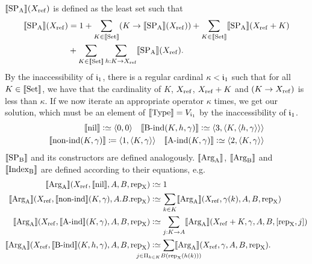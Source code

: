 \documentclass{article}
\begin{document}
$\llbracket \text{SP}_{\mathrm{A}} \rrbracket(X_{\mathrm{ref}})$ is defined as the least set such that
\begin{align*}
\llbracket \text{SP}_{\mathrm{A}} \rrbracket(X_{\mathrm{ref}}) &= 1 + \sum_{K \in \llbracket \text{Set} \rrbracket}(K \to \llbracket \text{SP}_{\mathrm{A}} \rrbracket(X_{\mathrm{ref}}))
  + \sum_{K \in \llbracket \text{Set} \rrbracket}\llbracket \text{SP}_{\mathrm{A}} \rrbracket(X_{\mathrm{ref}} + K) \\
 & {} + \sum_{K \in \llbracket \text{Set} \rrbracket}\sum_{h : K \to X_{\mathrm{ref}}}\llbracket \text{SP}_{\mathrm{A}} \rrbracket(X_{\mathrm{ref}}).
\end{align*}
 By the inaccessibility of $\mathfrak{i}_1$, there is a
regular cardinal ${\kappa < \mathfrak{i}_1}$ such that for all $K \in \llbracket \text{Set} \rrbracket$, we
have that the cardinality of $K$, $X_{\mathrm{ref}}$, $X_{\mathrm{ref}} + K$ and $(K \to X_{\mathrm{ref}})$ is less than
$\kappa$. If we now iterate an appropriate operator $\kappa$ times, we get our
solution, which must be an element of $\llbracket \text{Type} \rrbracket = V_{\mathfrak{i}_1}$ by the
inaccessibility of $\mathfrak{i}_1$.
\begin{align*}
 \llbracket \text{nil} \rrbracket \mathrel{\mathop:}\simeq \langle 0, 0\rangle \quad
 \llbracket \text{B-ind}(K, h, \gamma) \rrbracket \mathrel{\mathop:}\simeq \langle 3 , \langle K, \langle h, \gamma \rangle\rangle\rangle
   \\
  \llbracket \text{non-ind}(K, \gamma) \rrbracket \coloneqq \langle 1 , \langle K, \gamma
  \rangle\rangle \quad \llbracket \text{A-ind}(K, \gamma) \rrbracket \mathrel{\mathop:}\simeq \langle 2 , \langle K, \gamma \rangle\rangle
\end{align*}
$\llbracket \text{SP}_{\mathrm{B}} \rrbracket$ and its constructors are defined
analogously. $\llbracket \text{Arg}_{\mathrm{A}} \rrbracket$, $\llbracket \text{Arg}_{\mathrm{B}} \rrbracket$ and $\llbracket \text{Index}_{\mathrm{B}} \rrbracket$ are defined according to their equations,
e.g.\ 
\begin{align*}
  \sem{\ArgA}(\Xref, \sem{\nilA}, A, B, \repA) &\colonsimeq 1 \\
\sem{\ArgA}(\Xref, \sem{\nonindA}(K, \gamma), A. B. \repA) &\colonsimeq
  \sum_{k \in K} \sem{\ArgA}(\Xref, \gamma(k), A, B, \repA) \\
\sem{\ArgA}(\Xref, \sem{\AindA}(K, \gamma), A, B, \repA) &\colonsimeq
  \sum_{j : K \to A}\sem{\ArgA}(\Xref + K, \gamma, A, B, [\repA, j]) \\
\sem{\ArgA}(\Xref, \sem{\BindA}(K, h, \gamma), A, B, \repA) &\colonsimeq
  \sum_{\mathclap{j \in \Pi_{k \in K} B(\repA (h(k)))}}\sem{\ArgA}(\Xref, \gamma, A, B, \repA).
\end{align*}
%
%
\end{document}
